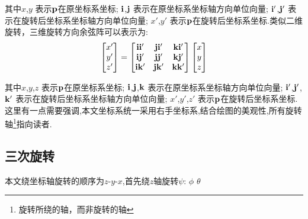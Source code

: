其中$x$,$y$     表示$\mathbf{p}$在原坐标系坐标;
$\mathbf{i}$,$\mathbf{j}$   表示在原坐标系坐标轴方向单位向量;
$\mathbf{i}'$,$\mathbf{j}'$ 表示在旋转后坐标系坐标轴方向单位向量;
$x'$,$y'$       表示$\mathbf{p}$在旋转后坐标系坐标.类似二维旋转，三维旋转方向余弦阵可以表示为:
\begin{equation}\label{三维方向余弦阵}
    \begin{split}
        \left[\begin{matrix}
                x' \\
                y' \\
                z'
        \end{matrix}\right]
        =
        \left[\begin{matrix}
                \mathbf{i}\mathbf{i}' & \mathbf{j}\mathbf{i}' & \mathbf{k}\mathbf{i}' \\
                \mathbf{i}\mathbf{j}' & \mathbf{j}\mathbf{j}' & \mathbf{k}\mathbf{j}' \\
                \mathbf{i}\mathbf{k}' & \mathbf{j}\mathbf{k}' & \mathbf{k}\mathbf{k}'
        \end{matrix}\right]
        \left[\begin{matrix}
                x \\
                y \\
                z
        \end{matrix}\right]
    \end{split}
\end{equation}

其中$x$,$y$,$z$         表示$\mathbf{p}$在原坐标系坐标;
$\mathbf{i}$,$\mathbf{j}$,$\mathbf{k}$    表示在原坐标系坐标轴方向单位向量;
$\mathbf{i}'$,$\mathbf{j}'$,$\mathbf{k}'$ 表示在旋转后坐标系坐标轴方向单位向量;
$x'$,$y'$,$z'$          表示$\mathbf{p}$在旋转后坐标系坐标. 这里有一点需要强调,本文坐标系统一采用\textcolor[rgb]{1,0,0}{右手坐标系},结合绘图的美观性,所有旋转轴\footnote{旋转所绕的轴，而非旋转的轴}指向读者.

\subsection{三次旋转}
本文绕坐标轴旋转的顺序为$z$-$y$-$x$,首先绕$z$轴旋转$\psi$:
$\phi$
$\theta$

